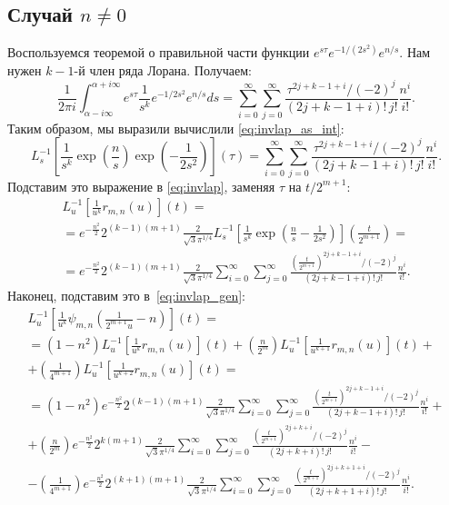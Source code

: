 \documentclass[12pt, a4paper]{report}
\begin{document}
\subsection{Случай $n \neq 0$}
Воспользуемся теоремой о правильной части функции $e^{s\tau} e^{-1/(2s^2)} e^{n/s}$. Нам нужен $k-1$-й член ряда Лорана. Получаем:
\[
    \frac{1}{2\pi i}\int_{\alpha-i\infty}^{\alpha+i\infty} e^{s\tau} \frac{1}{s^k} e^{-1/{2s^2}} e^{n/s} ds =
    \sum_{i=0}^{\infty} \sum_{j=0}^{\infty} \frac{\tau^{2j+k-1+i} / (-2)^j}{(2j+k-1+i)!\,j!} \frac{n^i}{i!}
.\]
Таким образом, мы выразили вычислили \ref{eq:invlap_as_int}:
\[
    L^{-1}_s \left[ \frac{1}{s^k}
    \exp \left(\frac{n}{s}\right)
    \exp \left(-\frac{1}{2 s^2 }\right)
    \right] \left( \tau \right)
=
    \sum_{i=0}^{\infty} \sum_{j=0}^{\infty} \frac{\tau^{2j+k-1+i} / (-2)^j}{(2j+k-1+i)!\,j!} \frac{n^i}{i!}
.\]
Подставим это выражение в \ref{eq:invlap}, заменяя $\tau$ на $t/2^{m+1}$:
\begin{multline*}
    L^{-1}_u \left[ \frac{1}{u^k} r_{m,n}(u) \right](t)
=\\=%
    e^{-\frac{n^2}{2}} 2^{(k-1)(m+1)} \frac{2}{\sqrt{3} \pi^{1/4}}
    L^{-1}_s \left[ \frac{1}{s^k}
    \exp \left(\frac{n}{s} - \frac{1}{2 s^2 }
    \right)
    \right] \left( \frac{t}{2^{m+1}} \right)
=\\=%
    e^{-\frac{n^2}{2}} 2^{(k-1)(m+1)} \frac{2}{\sqrt{3} \pi^{1/4}}
    \sum_{i=0}^{\infty} \sum_{j=0}^{\infty} \frac{\left( \frac{t}{2^{m+1}} \right) ^{2j+k-1+i} / (-2)^j}{(2j+k-1+i)!\,j!} \frac{n^i}{i!}
.\end{multline*}
Наконец, подставим это в~\ref{eq:invlap_gen}:
\begin{multline}
    L^{-1}_u \left[ \frac{1}{u^k} \psi_{m,n} \left( \frac{1}{2^{m+1} u} - n \right) \right] (t) 
=\\=
    \left( 1 - n^2 \right)  L^{-1}_u \left[ \frac{1}{u^k} r_{m,n}(u) \right](t) +
    \left( \frac{n}{2^m} \right)  L^{-1}_u \left[ \frac{1}{u^{k+1}} r_{m,n}(u) \right](t)
+\\+
    \left( \frac{1}{4^{m+1}} \right)  L^{-1}_u \left[ \frac{1}{u^{k+2}} r_{m,n}(u) \right](t)
=\\=
    \left( 1-n^2 \right) 
    e^{-\frac{n^2}{2}} 2^{(k-1)(m+1)} \frac{2}{\sqrt{3} \pi^{1/4}}
    \sum_{i=0}^{\infty} \sum_{j=0}^{\infty} \frac{\left( \frac{t}{2^{m+1}} \right) ^{2j+k-1+i} / (-2)^j}{(2j+k-1+i)!\,j!} \frac{n^i}{i!}
+\\+
    \left( \frac{n}{2^m} \right) 
    e^{-\frac{n^2}{2}} 2^{k(m+1)} \frac{2}{\sqrt{3} \pi^{1/4}}
    \sum_{i=0}^{\infty} \sum_{j=0}^{\infty} \frac{\left( \frac{t}{2^{m+1}} \right) ^{2j+k+i} / (-2)^j}{(2j+k+i)!\,j!} \frac{n^i}{i!}
-\\-
    \left( \frac{1}{4^{m+1}} \right) 
    e^{-\frac{n^2}{2}} 2^{(k+1)(m+1)} \frac{2}{\sqrt{3} \pi^{1/4}}
    \sum_{i=0}^{\infty} \sum_{j=0}^{\infty} \frac{\left( \frac{t}{2^{m+1}} \right) ^{2j+k+1+i} / (-2)^j}{(2j+k+1+i)!\,j!} \frac{n^i}{i!}
.\end{multline}
\end{document}
